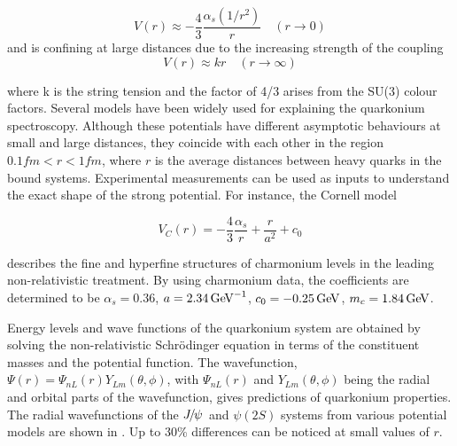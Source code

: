 \begin{equation}
V(r) \approx -{\frac{4}{3}}{\frac{\alpha_s(1/r^2)}{r}} \quad (r\rightarrow 0)
\end{equation}
\noindent and is confining at large distances due to the increasing strength 
of the coupling
\begin{equation}
V(r) \approx kr \quad (r\rightarrow \infty)
\end{equation}

\noindent where k is the string tension and the factor of 4/3 arises from the
SU(3) colour factors. Several models have been widely used for explaining the
quarkonium spectroscopy. Although these potentials have different asymptotic
behaviours at small and large distances, they coincide with each other in the
region $0.1 fm < r <1 fm$, where $r$ is the average distances between heavy quarks
in the bound systems. Experimental measurements can be used as inputs to
understand the exact shape of the strong potential. For instance, the Cornell
model

\begin{equation}
V_C(r) = -{\frac{4}{3}}{\frac{\alpha_s}{r}} + {\frac{r}{a^2}} + c_0
\end{equation}  

\noindent describes the fine and hyperfine structures of charmonium levels in the leading
non-relativistic treatment. By using charmonium data, the coefficients are
determined to be $\alpha_s = 0.36$, $a=2.34 \mathrm{\,Ge\kern -0.1em V}^{-1}$, $c_0 = -0.25 \mathrm{\,Ge\kern -0.1em V}$, $m_c
= 1.84\mathrm{\,Ge\kern -0.1em V}$.

Energy levels and wave functions of the quarkonium system are obtained by solving 
the non-relativistic Schr\"odinger equation in terms of the constituent masses and the 
potential function. The wavefunction, $\Psi(r) = \Psi_{nL}(r)Y_{Lm}(\theta,\phi)$, with 
$\Psi_{nL}(r)$ and $Y_{Lm}(\theta,\phi)$ being the radial and orbital parts of the wavefunction, 
gives predictions of quarkonium properties. The radial wavefunctions of the ${{J\mskip -3mu/\mskip -2mu\psi\mskip 2mu}}$ and 
$\psi(2S)$ systems from various potential models are shown in . 
Up to 30\% differences can be noticed at small values of $r$. 

